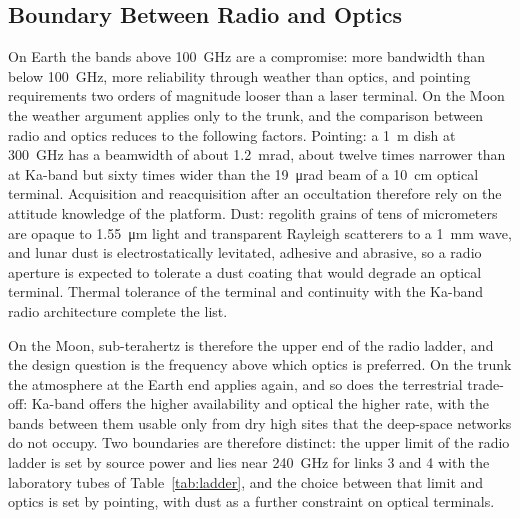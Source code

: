 \documentclass{IEEEoj}
\begin{document}
\subsection{Boundary Between Radio and Optics}
On Earth the bands above \SI{100}{GHz} are a compromise: more bandwidth than below \SI{100}{GHz}, more reliability through weather than optics, and pointing requirements two orders of magnitude looser than a laser terminal. On the Moon the weather argument applies only to the trunk, and the comparison between radio and optics reduces to the following factors. Pointing: a \SI{1}{m} dish at \SI{300}{GHz} has a beamwidth of about \SI{1.2}{mrad}, about twelve times narrower than at Ka-band but sixty times wider than the \SI{19}{\micro\radian} beam of a \SI{10}{cm} optical terminal. Acquisition and reacquisition after an occultation therefore rely on the attitude knowledge of the platform. Dust: regolith grains of tens of micrometers are opaque to \SI{1.55}{\micro\metre} light and transparent Rayleigh scatterers to a \SI{1}{mm} wave, and lunar dust is electrostatically levitated, adhesive and abrasive, so a radio aperture is expected to tolerate a dust coating that would degrade an optical terminal. Thermal tolerance of the terminal and continuity with the Ka-band radio architecture complete the list.

On the Moon, sub-terahertz is therefore the upper end of the radio ladder, and the design question is the frequency above which optics is preferred. On the trunk the atmosphere at the Earth end applies again, and so does the terrestrial trade-off: Ka-band offers the higher availability and optical the higher rate, with the bands between them usable only from dry high sites that the deep-space networks do not occupy. Two boundaries are therefore distinct: the upper limit of the radio ladder is set by source power and lies near \SI{240}{GHz} for links 3 and 4 with the laboratory tubes of Table~\ref{tab:ladder}, and the choice between that limit and optics is set by pointing, with dust as a further constraint on optical terminals.
\end{document}
